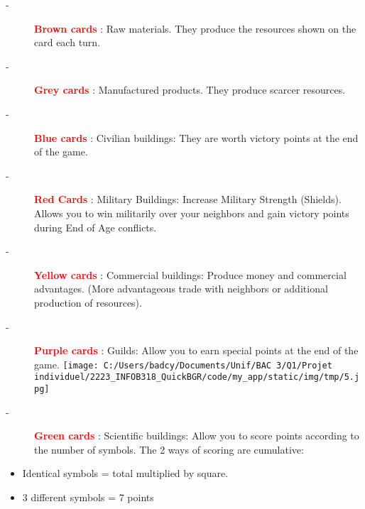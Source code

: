 \documentclass{scrartcl}%
\begin{document}
%
\begin{description}%
\item[{-} ]%
%
\textcolor{red}{%
\textbf{Brown cards}%
}%
: Raw materials. They produce the resources shown on the card each turn.
%
\item[{-} ]%
%
\textcolor{red}{%
\textbf{Grey cards}%
}%
: Manufactured products. They produce scarcer resources.
%
\item[{-} ]%
%
\textcolor{red}{%
\textbf{Blue cards}%
}%
: Civilian buildings: They are worth victory points at the end of the game.
%
\item[{-} ]%
%
\textcolor{red}{%
\textbf{Red Cards}%
}%
: Military Buildings: Increase Military Strength (Shields). Allows you to win militarily over your neighbors and gain victory points during End of Age conflicts.
%
\item[{-} ]%
%
\textcolor{red}{%
\textbf{Yellow cards}%
}%
: Commercial buildings: Produce money and commercial advantages. (More advantageous trade with neighbors or additional production of resources).
%
\item[{-} ]%
%
\textcolor{red}{%
\textbf{Purple cards}%
}%
: Guilds: Allow you to earn special points at the end of the game.%
\texttt{[image: C:/Users/badcy/Documents/Unif/BAC 3/Q1/Projet individuel/2223\_INFOB318\_QuickBGR/code/my\_app/static/img/tmp/5.jpg]}%

%
\item[{-} ]%
%
\textcolor{red}{%
\textbf{Green cards}%
}%
: Scientific buildings: Allow you to score points according to the number of symbols. The 2 ways of scoring are cumulative:
%
\end{description}%
\begin{itemize}%
\item%
%
 Identical symbols = total multiplied by square.
%
\item%
%
 3 different symbols = 7 points
%
\end{itemize}

%
\sectionfont{\color{cyan}}%
\subsectionfont{\color{cyan}}%
\subsubsectionfont{\color{cyan}}%
\end{document}
